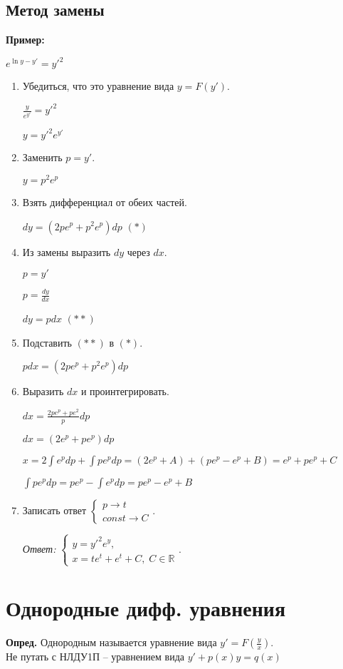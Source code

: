 \documentclass[10pt, a4paper]{article}
\begin{document}
\subsection{Метод замены}
\textbf{Пример:}
\par $e^{\ln{y} - y'} = y'^2$
\begin{enumerate}
    \item Убедиться, что это уравнение вида $y = F(y')$.
        \par $\frac{y}{e^{y'}} = y'^2$
        \par $y = y'^2e^{y'}$
    \item Заменить $p = y'$.
        \par $y = p^2e^p$
    \item Взять дифференциал от обеих частей.
        \par $dy = (2pe^p + p^2e^p)dp$ $(*)$
    \item Из замены выразить $dy$ через $dx$.
        \par $p = y'$
        \par $p = \frac{dy}{dx}$
        \par $dy = pdx$ $(**)$
    \item Подставить $(**)$ в $(*)$.
        \par $pdx = (2pe^p + p^2e^p)dp$
    \item Выразить $dx$ и проинтегрировать.
        \par $dx = \frac{2pe^p + pe^2}{p}dp$
        \par $dx = (2e^p + pe^p)dp$
        \par $x = 2\int{e^pdp} + \int{pe^pdp} = (2e^p + A) + (pe^p - e^p + B) = e^p + pe^p + C$
        \par $\int{pe^pdp} = pe^p - \int{e^pdp} = pe^p - e^p + B$
    \item Записать ответ
        $\begin{cases}
            p \rightarrow t \\
            const \rightarrow C
        \end{cases}$.
        \par\textit{Ответ:}
        $\begin{cases}
            y = y'^2e^y, \\
            x = te^t+e^t + C, \; C \in \mathbb{R}
        \end{cases}$.
\end{enumerate}


\section{Однородные дифф. уравнения}
\textbf{Опред.} Однородным называется уравнение вида $y' = F(\frac{y}{x})$. \\
Не путать с НЛДУ1П -- уравнением вида $y' + p(x)y = q(x)$
\end{document}
